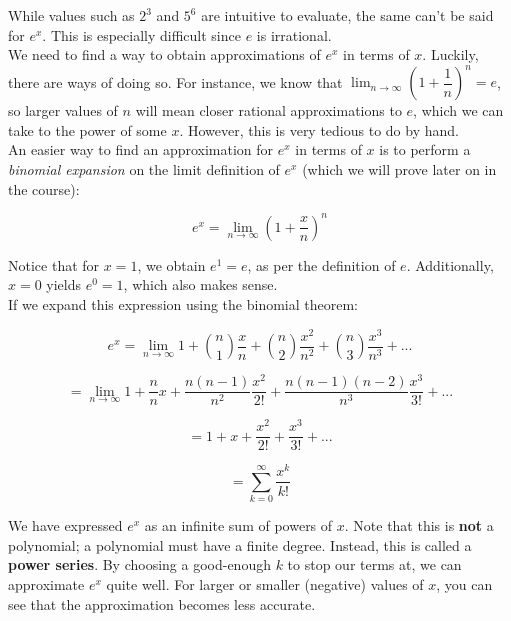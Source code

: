\documentclass[12pt, a4paper, titlepage, twoside]{article}
\begin{document}
	\begin{fr}
		While values such as $2^3$ and $5^6$ are intuitive to evaluate, the same can't be said for $e^x$. This is especially
		difficult since $e$ is irrational.\\
	
		We need to find a way to obtain approximations of $e^x$ in terms of $x$. Luckily, there are ways of doing so. For instance,
		we know that $\displaystyle \lim_{n \to \infty} \left(1+\dfrac{1}{n}\right)^n = e$, so larger values of $n$ will mean closer rational
		approximations to $e$, which we can take to the power of some $x$. However, this is very tedious to do by hand.\\
		
		An easier way to find an approximation for $e^x$ in terms of $x$ is to perform a \textit{binomial expansion} on the limit
		definition of $e^x$ (which we will prove later on in the course):
		
		$$e^x = \lim_{n \to \infty} \left(1+\dfrac{x}{n}\right)^n$$
		
		\hfill
		
		Notice that for $x=1$, we obtain $e^1 = e$, as per the definition of $e$. Additionally, $x=0$ yields $e^0 = 1$, which also makes
		sense.\\
		
		If we expand this expression using the binomial theorem:
		
		$$e^x = \lim_{n \to \infty} 1 + {n \choose 1} \dfrac{x}{n} + {n \choose 2} \dfrac{x^2}{n^2} + {n \choose 3} \dfrac{x^3}{n^3} + ...$$
		
		$$= \lim_{n \to \infty} 1 + \dfrac{n}{n} x + \dfrac{n(n-1)}{n^2} \dfrac{x^2}{2!} + \dfrac{n(n-1)(n-2)}{n^3} \dfrac{x^3}{3!} + ...$$
		
		$$= 1 + x + \dfrac{x^2}{2!} + \dfrac{x^3}{3!} + ...$$
		
		$$= \sum_{k=0}^{\infty} \dfrac{x^k}{k!}$$
		
		\hfill
		
		We have expressed $e^x$ as an infinite sum of powers of $x$. Note that this is \textbf{not} a polynomial; a polynomial must have a 
		finite degree. Instead, this is called a \textbf{power series}. By choosing a good-enough $k$ to stop our terms 
		at, we can approximate $e^x$ quite well. For larger or smaller (negative) values of $x$, you can see that the approximation becomes 
		less accurate.
	\end{fr}
	
\end{document}
